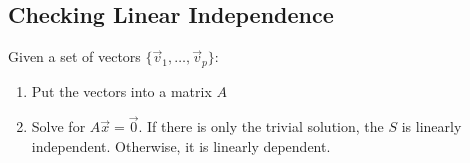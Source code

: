 \documentclass[a4paper,12pt]{article}
\theoremstyle{definition}
\theoremstyle{definition}
\newcommand{\mateq}[3]{#1#2 = #3}
\newcommand{\finitevecs}[2]{#1_1,\ldots,#1_#2}
\newcommand{\finitevecsset}[2]{\{\finitevecs{#1}{#2}\}}
\begin{document}
	\subsection{Checking Linear Independence}
	\label{sec:lin-indep-check}
	
	Given a set of vectors $\finitevecsset{\vec{v}}{p}$:
	
	\begin{enumerate}
		\item Put the vectors into a matrix $A$
		
		\item Solve for $\mateq{A}{\vec{x}}{\vec{0}}$. If there is only the trivial solution, the $S$ is linearly independent. Otherwise, it is linearly dependent.
	\end{enumerate}
	\newpage
	
\end{document}
